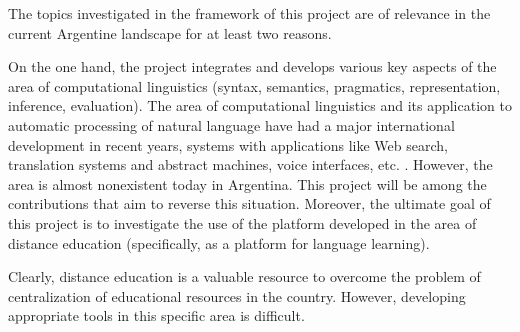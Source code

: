 
The topics investigated in the framework of this project are of relevance in the
current Argentine landscape for at least two reasons.


On the one hand, the project integrates and develops various key aspects of the
area of computational linguistics (syntax, semantics, pragmatics,
representation, inference, evaluation). The area of computational linguistics
and its application to automatic processing of natural language have had a major
international development in recent years, systems with applications like Web
search, translation systems and abstract machines, voice interfaces, etc. .
However, the area is almost nonexistent today in Argentina. This project will be
among the contributions that aim to reverse this situation. Moreover, the
ultimate goal of this project is to investigate the use of the platform
developed in the area of distance education (specifically, as a platform for
language learning).


Clearly, distance education is a valuable resource to overcome the problem of
centralization of educational resources in the country. However, developing
appropriate tools in this specific area is difficult.

